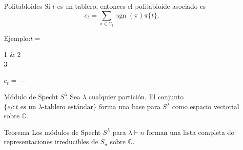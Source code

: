 \documentclass[final,xcolor=svgnames]{beamer}
\DeclareMathOperator{\sgn}{sgn}
\begin{document}
\begin{frame}{}
\begin{columns}
\begin{column}{0.5\textwidth}
      \begin{block}{Politabloides}
        Si $t$ es un tablero, entonces el \alert{politabloide} asociado es
        $$e_{t}=\sum_{\pi\in C_{t}}\sgn(\pi)\pi\{t\}.$$
        \begin{center} Ejemplo:\quad $t=$
          \begin{ytableau}
            1 & 2 \\
            3
          \end{ytableau}\quad
          $e_{t}=$
          $-$ 
        \end{center}
      \end{block}

      \begin{block}{Módulo de Specht $S^{\lambda}$}
        Sea $\lambda$ cualquier partición. El conjunto $\{e_{t}:t
        \mbox{ es un }\lambda\mbox{-tablero estándar}\}$
        forma una base para $S^{\lambda}$ como espacio vectorial
        sobre $\mathbb{C}$.
      \end{block} 

       \begin{block}{Teorema}
       Los módulos de Specht $S^{\lambda}$ para $\lambda\vdash n$ forman
       una lista completa de representaciones irreducibles de $S_{n}$ sobre $\mathbb{C}$.
     \end{block}
    \end{column}

    \begin{column}{0.5\textwidth}
      
        

\end{column}
\end{columns}
\end{frame}
\end{document}
